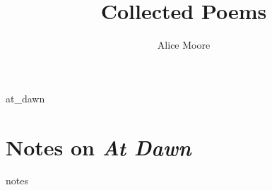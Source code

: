 \documentclass[statementpaper, twoside,openright, final]{memoir}
\title{Collected Poems}
\author{Alice Moore}
\date{}
\begin{document}
\setlength\epigraphwidth{5cm}
\setlength\epigraphrule{0pt}
\epigraphfontsize{\footnotesize}

\setlength\vgap{2.5em}

\renewcommand*{\beforepartskip}{\null\vskip 0pt plus 0.3fil}
\PlainPoemTitle

\pagestyle{simple}

\frontmatter

\begin{titlingpage}
\maketitle
\end{titlingpage}

\let\tocheadstart\relax
\tableofcontents*


\mainmatter

{at_dawn}

\renewcommand{\poemtoc}{chapter}
\renewcommand\appendixname{Notes}

\appendix

\chapter{Notes on \textit{At Dawn}}
{notes}
\end{document}

